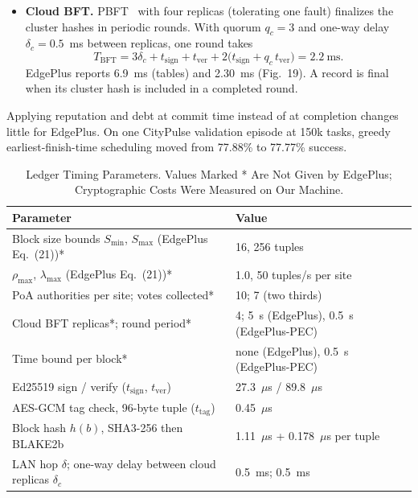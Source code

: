 \documentclass[11pt,journal,onecolumn]{IEEEtran}
\begin{document}
\begin{itemize}
\begin{align}
\end{align}
with $\beta = 0.05$ and $\kappa = 1$. Here $\Theta_c$ is site $c$'s on-time completion rate, averaged exponentially with a 30~s time constant, and $\bar{\Theta}$ is its mean over sites.
\item \textbf{Cloud BFT.} PBFT~\cite{pbft} with four replicas (tolerating one fault) finalizes the cluster hashes in periodic rounds. With quorum $q_c=3$ and one-way delay $\delta_c=0.5$~ms between replicas, one round takes
\begin{equation}
T_{\mathrm{BFT}} = 3\delta_c + t_{\mathrm{sign}} + t_{\mathrm{ver}} + 2\bigl(t_{\mathrm{sign}} + q_c\, t_{\mathrm{ver}}\bigr) = 2.2~\text{ms}.
\label{eq:bft}
\end{equation}
EdgePlus reports 6.9~ms (tables) and 2.30~ms (Fig.~19). A record is final when its cluster hash is included in a completed round.
\end{itemize}
Applying reputation and debt at commit time instead of at completion changes little for EdgePlus. On one CityPulse validation episode at 150k tasks, greedy earliest-finish-time scheduling moved from 77.88\% to 77.77\% success.

\begin{table}[!t]
\centering
\caption{Ledger Timing Parameters. Values Marked * Are Not Given by EdgePlus; Cryptographic Costs Were Measured on Our Machine.}
\label{tab:ledger}
\footnotesize
\begin{tabular}{p{}p{}}
\toprule
Parameter & Value\\
\midrule
Block size bounds $S_{\min}$, $S_{\max}$ (EdgePlus Eq.~(21))* & 16, 256 tuples\\
$\rho_{\max}$, $\lambda_{\max}$ (EdgePlus Eq.~(21))* & 1.0, 50 tuples/s per site\\
PoA authorities per site; votes collected* & 10; 7 (two thirds)\\
Cloud BFT replicas*; round period* & 4; 5~s (EdgePlus), 0.5~s (EdgePlus-PEC)\\
Time bound per block* & none (EdgePlus), 0.5~s (EdgePlus-PEC)\\
Ed25519 sign / verify ($t_{\mathrm{sign}}$, $t_{\mathrm{ver}}$) & 27.3~$\mu$s / 89.8~$\mu$s\\
AES-GCM tag check, 96-byte tuple ($t_{\mathrm{tag}}$) & 0.45~$\mu$s\\
Block hash $h(b)$, SHA3-256 then BLAKE2b & 1.11~$\mu$s + 0.178~$\mu$s per tuple\\
LAN hop $\delta$; one-way delay between cloud replicas $\delta_c$ & 0.5~ms; 0.5~ms\\
\bottomrule
\end{tabular}
\end{table}
\end{document}
